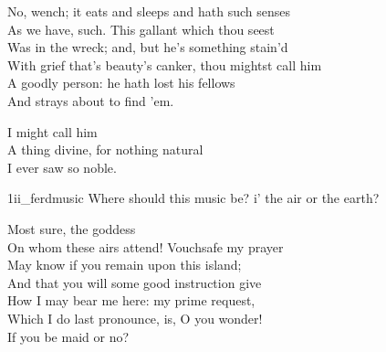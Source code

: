 \begin{verse_speech}[Prospero] 
No, wench; it eats and sleeps and hath such senses\\
As we have, such. This gallant which thou seest\\
Was in the wreck; and, but he's something stain'd\\
With grief that's beauty's canker, thou mightst call him\\
A goodly person: he hath lost his fellows\\
And strays about to find 'em.
\end{verse_speech}

\begin{verse_speech}[Miranda] 
I might call him\\
A thing divine, for nothing natural\\
I ever saw so noble.
\end{verse_speech}



\begin{pictures} %
	\begin{letter}
		\begin{colorbigpic}
			[1.1]
			{1ii_ferdmusic}
			{Where should this music be? i' the air or the earth?}
		\end{colorbigpic}
	\end{letter}
\end{pictures}
	



\begin{verse_speech}[Prospero]
\end{verse_speech}

\begin{verse_speech}[Ferdinand] 
Most sure, the goddess\\
On whom these airs attend! Vouchsafe my prayer\\
May know if you remain upon this island;\\
And that you will some good instruction give\\
How I may bear me here: my prime request,\\
Which I do last pronounce, is, O you wonder!\\
If you be maid or no?
\end{verse_speech}

